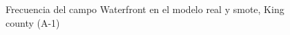 \begin{figure}[H]
    \centering
    
    \caption{Frecuencia del campo Waterfront en el modelo real y smote, King county (A-1)}
    \label{frecuency-smote-waterfront}
\end{figure}